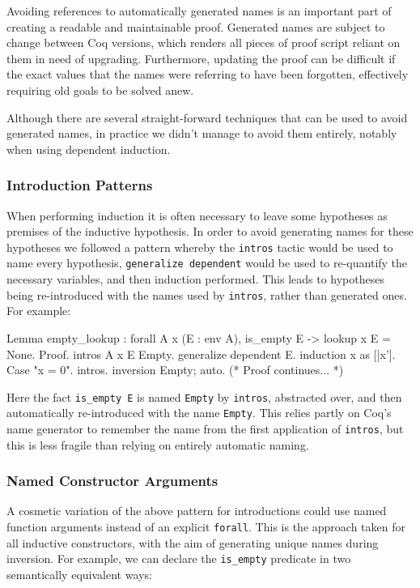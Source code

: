 \documentclass[]{unswthesis}
\let\c\texttt
\begin{document}
Avoiding references to automatically generated names is an important part of creating a readable and maintainable proof. Generated names are subject to change between Coq versions, which renders all pieces of proof script reliant on them in need of upgrading. Furthermore, updating the proof can be difficult if the exact values that the names were referring to have been forgotten, effectively requiring old goals to be solved anew.

Although there are several straight-forward techniques that can be used to avoid generated names, in practice we didn't manage to avoid them entirely, notably when using dependent induction.

\subsubsection{Introduction Patterns}

When performing induction it is often necessary to leave some hypotheses as premises of the inductive hypothesis. In order to avoid generating names for these hypotheses we followed a pattern whereby the \c{intros} tactic would be used to name every hypothesis, \c{generalize dependent} would be used to re-quantify the necessary variables, and then induction performed. This leads to hypotheses being re-introduced with the names used by \c{intros}, rather than generated ones. For example:

\begin{coqcode}
Lemma empty_lookup : forall A x (E : env A), is_empty E ->
  lookup x E = None.
Proof.
  intros A x E Empty.
  generalize dependent E.
  induction x as [|x'].
  Case "x = 0".
    intros. inversion Empty; auto.
  (* Proof continues... *)
\end{coqcode}

Here the fact \c{is_empty E} is named \c{Empty} by \c{intros}, abstracted over, and then automatically re-introduced with the name \c{Empty}. This relies partly on Coq's name generator to remember the name from the first application of \c{intros}, but this is less fragile than relying on entirely automatic naming.

\subsubsection{Named Constructor Arguments}

A cosmetic variation of the above pattern for introductions could use named function arguments instead of an explicit \c{forall}. This is the approach taken for all inductive constructors, with the aim of generating unique names during inversion. For example, we can declare the \c{is_empty} predicate in two semantically equivalent ways:
\end{document}
